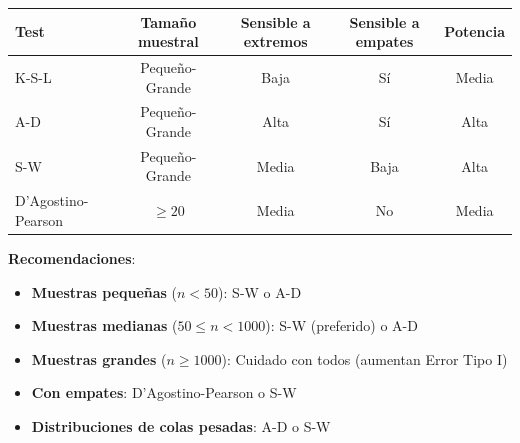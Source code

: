 \documentclass[10pt,a4paper]{article}
\begin{document}
\begin{tcolorbox}[title=Comparación de Tests de Normalidad]
    \begin{center}
    \begin{tabular}{|l|c|c|c|c|}
    \hline
    \textbf{Test} & \textbf{Tamaño muestral} & \textbf{Sensible a extremos} & \textbf{Sensible a empates} & \textbf{Potencia} \\
    \hline
    K-S-L & Pequeño-Grande & Baja & Sí & Media \\
    \hline
    A-D & Pequeño-Grande & Alta & Sí & Alta \\
    \hline
    S-W & Pequeño-Grande & Media & Baja & Alta \\
    \hline
    D'Agostino-Pearson & $\geq 20$ & Media & No & Media \\
    \hline
    \end{tabular}
    \end{center}
    
    \textbf{Recomendaciones}:
    \begin{itemize}
        \item \textbf{Muestras pequeñas} ($n < 50$): S-W o A-D
        \item \textbf{Muestras medianas} ($50 \leq n < 1000$): S-W (preferido) o A-D
        \item \textbf{Muestras grandes} ($n \geq 1000$): Cuidado con todos (aumentan Error Tipo I)
        \item \textbf{Con empates}: D'Agostino-Pearson o S-W
        \item \textbf{Distribuciones de colas pesadas}: A-D o S-W
    \end{itemize}
\end{tcolorbox}
\end{document}
